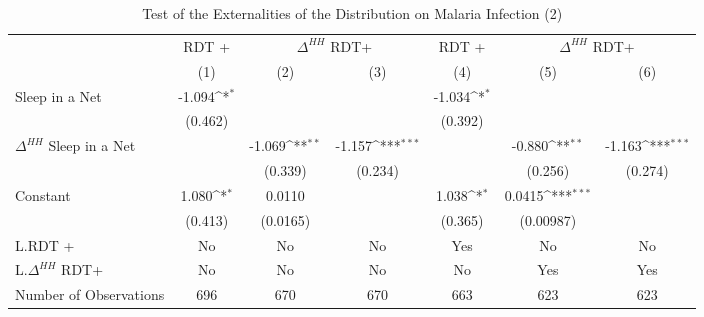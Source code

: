 \documentclass[fleqn,11pt]{article}
\newcommand{\sym}[1]{\rlap{$#1$}}
\def\sym#1{\ifmmode^{#1}\else\(^{#1}\)\fi
}
\begin{document}
\begin{table}[h]
\caption{Test of the Externalities of the Distribution on Malaria Infection (2)}
\label{externality_withinhh2}
\centering
\begin{threeparttable}
\begin{tabular}{l*{6}{c}}
\hline\hline

                    &\multicolumn{1}{c}{RDT +}&\multicolumn{2}{c}{$\Delta^{HH}$  RDT+  }&\multicolumn{1}{c}{RDT +}&\multicolumn{2}{c}{$\Delta^{HH}$  RDT+  }\\   \cmidrule(lr){2-2}   \cmidrule(lr){3-4}   \cmidrule(lr){5-5}   \cmidrule(lr){6-7}
                                        &\multicolumn{1}{c}{(1)}&\multicolumn{1}{c}{(2)}&\multicolumn{1}{c}{(3)}&\multicolumn{1}{c}{(4)}&\multicolumn{1}{c}{(5)}&\multicolumn{1}{c}{(6)}\\
\hline
Sleep in a Net      &      -1.094\sym{*}  &                     &                     &      -1.034\sym{*}  &                     &                     \\
                    &     (0.462)         &                     &                     &     (0.392)         &                     &                     \\
[1em]
$\Delta^{HH}$ Sleep in a Net      &                     &      -1.069\sym{**} &      -1.157\sym{***}&                     &      -0.880\sym{**} &      -1.163\sym{***}\\
                    &                     &     (0.339)         &     (0.234)         &                     &     (0.256)         &     (0.274)         \\
Constant            &       1.080\sym{*}  &      0.0110         &                     &       1.038\sym{*}  &      0.0415\sym{***}&                     \\
                    &     (0.413)         &    (0.0165)         &                     &     (0.365)         &   (0.00987)         &                     \\
L.RDT +             &                     No &                     No &                     No &     Yes         &                     No& No                     \\
L.$\Delta^{HH}$  RDT+        &                    No  &                    No  &                    No  &                    No  &      Yes       &      Yes         \\
\hline
Number of Observations        &         696         &         670         &         670         &         663         &         623         &         623         \\

\end{tabular}
\end{threeparttable}
\end{table}
\end{document}
